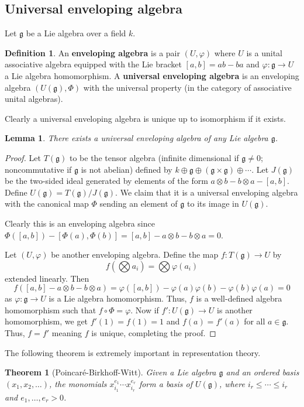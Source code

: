 \documentclass[12pt]{report}
\newtheorem{theorem}{Theorem}[section]
\newtheorem{lemma}{Lemma}[section]
\theoremstyle{remark}
\theoremstyle{definition}
\newtheorem{definition}{Definition}[section]
\begin{document}
    \subsection{Universal enveloping algebra}
    Let $\mathfrak g$ be a Lie algebra over a field $k$.
    \begin{definition}
        An \textbf{enveloping algebra} is a pair $(U,\varphi)$ where $U$ is a unital associative algebra equipped with the Lie bracket $[a, b]=ab-ba$ and $\varphi:\mathfrak g\to U$ a Lie algebra homomorphism. A \textbf{universal enveloping algebra} is an enveloping algebra $(U(\mathfrak g), \Phi)$ with the universal property (in the category of associative unital algebras).
    \end{definition}
    Clearly a universal enveloping algebra is unique up to isomorphism if it exists.
    \begin{lemma}
        There exists a universal enveloping algebra of any Lie algebra $\mathfrak g$.
    \end{lemma}
    \begin{proof}
        Let $T(\mathfrak g)$ to be the tensor algebra (infinite dimensional if $\mathfrak g\neq 0$; noncommutative if $\mathfrak g$ is not abelian) defined by $k\oplus \mathfrak g\oplus(\mathfrak g\times\mathfrak g)\oplus\cdots$. Let $J(\mathfrak g)$ be the two-sided ideal generated by elements of the form $a\otimes b-b\otimes a-[a, b]$. Define $U(\mathfrak g)=T(\mathfrak g)/J(\mathfrak g)$. We claim that it is a universal enveloping algebra with the canonical map $\Phi$ sending an element of $\mathfrak g$ to its image in $U(\mathfrak g)$.

        Clearly this is an enveloping algebra since $\Phi([a, b])-[\Phi(a),\Phi(b)]=[a, b]-a\otimes b-b\otimes a=0$. 

        Let $(U,\varphi)$ be another enveloping algebra. Define the map $f:T(\mathfrak g)\to U$ by 
        \[f\left(\bigotimes a_i\right)=\bigotimes\varphi(a_i)\]
        extended linearly. Then 
        \[f([a,b]-a\otimes b-b\otimes a)=\varphi([a, b])-\varphi(a)\varphi(b)-\varphi(b)\varphi(a)=0\]
        as $\varphi:\mathfrak g\to U$ is a Lie algebra homomorphism. Thus, $f$ is a well-defined algebra homomorphism such that $f\circ\Phi=\varphi$. Now if $f':U(\mathfrak g)\to U$ is another homomorphism, we get $f'(1)=f(1)=1$ and $f(a)=f'(a)$ for all $a\in\mathfrak g$. Thus, $f=f'$ meaning $f$ is unique, completing the proof.
    \end{proof}
    The following theorem is extremely important in representation theory.
    \begin{theorem}[Poincaré-Birkhoff-Witt]
        Given a Lie algebra $\mathfrak g$ and an ordered basis $(x_1,x_2,\dots)$, the monomials $x_{i_1}^{e_1}\cdots x_{i_r}^{e_r}$ form a basis of $U(\mathfrak g)$, where $i_r\leqslant \cdots\leqslant i_r$ and $e_1,\dots, e_r>0$.
    \end{theorem}
\end{document}
